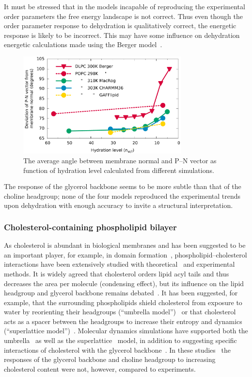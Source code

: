 \documentclass[journal=jacsat,manuscript=article]{achemso}
\begin{document}
It must be stressed that in the models
incapable of reproducing the experimental order parameters the free energy landscape is not correct. Thus
even though the order parameter response to dehydration is qualitatively correct,
the energetic response is likely to be incorrect.
This may have some influence on dehydration energetic calculations made using the Berger model~\cite{eun09,schneck12}.
\begin{figure}[]
  \centering
  \includegraphics[width=8.6cm]{../Fig/dehydrationPN.pdf}

  \caption{\label{PNangle}
    The average angle between membrane normal and P--N vector as function of
    hydration level calculated from different simulations.
  }
\end{figure}

The response of the glycerol backbone seems to be more subtle than that of the choline headgroup;
none of the four models reproduced the experimental trends upon dehydration with enough accuracy to invite a
structural interpretation.

\subsubsection{Cholesterol-containing phospholipid bilayer}
As cholesterol is abundant in biological membranes and
has been suggested to be an important player, for example, in domain formation~\cite{simons04,somerharju09},
phospholipid--cholesterol interactions have been extensively studied with theoretical~\cite{huang99,zhu07,rog09,alwarawrah12} and
experimental~\cite{brown78,marsh10,ferreira13,marsh13} methods.
It is widely agreed that cholesterol orders lipid acyl tails and thus decreases the area per molecule (condensing effect),
but its influence on the lipid headgroup and glycerol backbone remains debated~\cite{huang99,simons04,somerharju09}.
It has been suggested, for example, that the surrounding phospholipids shield cholesterol from exposure to water by 
reorienting their headgroups (``umbrella model'')~\cite{huang99} or that cholesterol acts as a spacer between the headgroups to increase 
their entropy and dynamics (``superlattice model'')~\cite{somerharju09}. 
Molecular dynamics simulations have supported both
the umbrella~\cite{alwarawrah12} as well as the superlattice~\cite{zhu07} model,
in addition to suggesting specific interactions of cholesterol with the glycerol backbone~\cite{rog09}.
In these studies~\cite{zhu07,rog09,alwarawrah12}
the responses of the glycerol backbone and choline headgroup 
to increasing cholesterol content were not, however, compared to experiments. 
\end{document}
